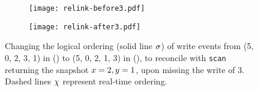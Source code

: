 \begin{figure}[t]
\begin{subfigure}[t]{0.49\textwidth}
\texttt{[image: relink-before3.pdf]}
\caption{\label{fig:reorder:before}} %
\end{subfigure} \hfill
\begin{subfigure}[t]{0.49\textwidth}
\texttt{[image: relink-after3.pdf]}
\caption{\label{fig:reorder:after}} %
\end{subfigure}%
%
\caption{\label{fig:reorder} Changing the logical ordering (solid line
  $\sigma$) of write events from (5, 0, 2, 3, 1) in
  () to (5, 0, 2, 1, 3) in
  (), to reconcile with {\tt scan} returning
  the snapshot $x=2, y=1$, upon missing the write of $3$. Dashed
  lines $\chi$ represent real-time ordering.}
\end{figure}
